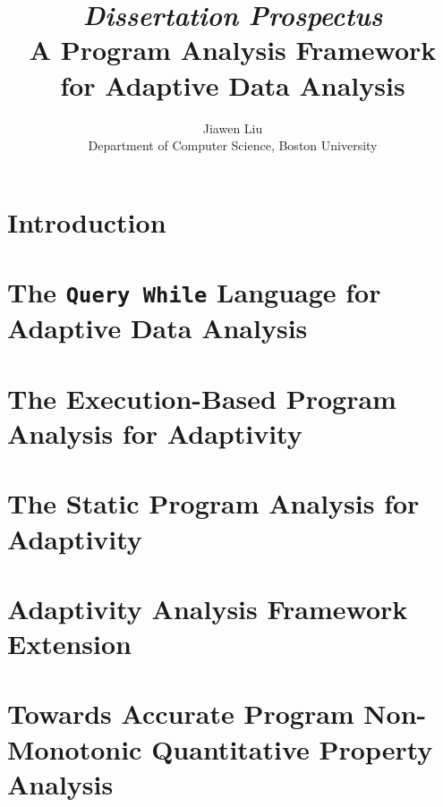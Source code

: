 \documentclass[a4paper,11pt]{article}
\begin{document}
\title{{\em Dissertation Prospectus}
\\ {A Program Analysis Framework for Adaptive Data Analysis}
}

\author{Jiawen Liu\\ Department of Computer Science, Boston University}
\maketitle
\begin{abstract}

\end{abstract}

\clearpage
\tableofcontents{}

\clearpage
\section{Introduction}
\label{sec:introduction}


\section{The {\tt Query While} Language for Adaptive Data Analysis}
\label{sec:language}


\section{The Execution-Based Program Analysis for Adaptivity}
\label{sec:dynamic}


\section{The Static Program Analysis for Adaptivity}
\label{sec:static}



\section{Adaptivity Analysis Framework Extension}
\label{sec:furthers}


\section{Towards Accurate Program Non-Monotonic Quantitative Property Analysis}
\label{sec:generalization}

\end{document}
